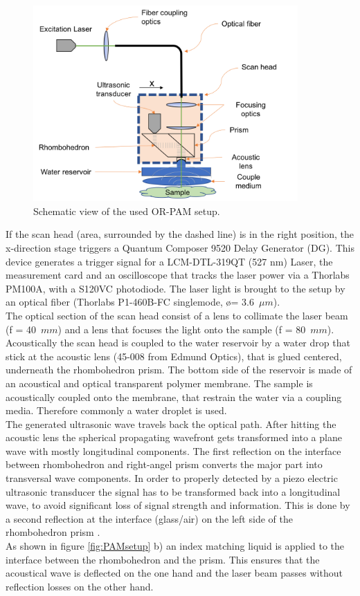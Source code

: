 \begin{figure}[H]
	\centering
	\includegraphics[width = 0.9\textwidth]{02_principles_of_photoacoustics/images/ORPAMsetup.png}
	\caption{Schematic view of the used OR-PAM setup.  }
	\label{fig:ORPAMsetup}
\end{figure}

If the scan head (area, surrounded by the dashed line) is in the right position, the x-direction stage triggers a Quantum Composer 9520 Delay Generator (DG). This device generates a trigger signal for a LCM-DTL-319QT (527 nm) Laser, the measurement card and an oscilloscope that tracks the laser power via a Thorlabs PM100A, with a S120VC photodiode. The laser light is brought to the setup by an optical fiber (Thorlabs P1-460B-FC singlemode, \o = 3.6~$\mu m$).\\
The optical section of the scan head consist of a lens to collimate the laser beam (f = 40~$mm$) and a lens that focuses the light onto the sample (f = 80~$mm$). Acoustically the scan head is coupled to the water reservoir by a water drop that stick at the acoustic lens (45-008 from Edmund Optics), that is glued centered, underneath the rhombohedron prism. The bottom side of the reservoir is made of an acoustical and optical transparent polymer membrane. The sample is acoustically coupled onto the membrane, that restrain the water via a coupling media. Therefore commonly a water droplet is used. \\
The generated ultrasonic wave travels back the optical path. After hitting the acoustic lens the spherical propagating wavefront gets transformed into a plane wave with mostly longitudinal components. The first reflection on the interface between rhombohedron and right-angel prism converts the major part into transversal wave components. In order to properly detected by a piezo electric ultrasonic transducer the signal has to be transformed back into a longitudinal wave, to avoid significant loss of signal strength and information. This is done by a second reflection at the interface (glass/air) on the left side of the rhombohedron prism \cite{Hu:11}. \\
As shown in figure \ref{fig:PAMsetup} b) an index matching liquid is applied to the interface between the rhombohedron and the prism. This ensures that the acoustical wave is deflected on the one hand and the laser beam passes without reflection losses on the other hand. 

